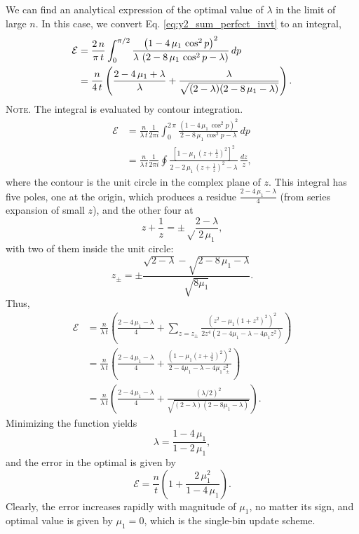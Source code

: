 \documentclass[reprint]{revtex4-1}
\newcommand{\note}[1]{{\color{DarkGreen}\footnotesize \textsc{Note.} #1}}
\begin{document}
We can find an analytical expression
of the optimal value of $\lambda$
in the limit of large $n$.
%
In this case,
we convert Eq.
\eqref{eq:y2_sum_perfect_invt}
to an integral,
$$
\begin{aligned}
\mathcal E
&=
\frac{2 \, n}{\pi \, t}
\int_0^{\pi/2}
\frac{ \left(1 - 4 \, \mu_1 \, \cos^2 p \right)^2 }
{ \lambda \, \left(2 - 8 \, \mu_1 \, \cos^2 p - \lambda \right) }
\, dp
\notag \\
&=
\frac{n}{4 \, t}
\left(
  \frac{2 - 4 \, \mu_1 + \lambda}{ \lambda }
  +
  \frac{ \lambda }
  { \sqrt{ (2 - \lambda) (2 - 8 \, \mu_1 - \lambda) } }
\right).
\end{aligned}
$$
\note{The integral is evaluated by contour integration.
$$
\begin{aligned}
\mathcal E
&=
\frac{n}{\lambda \, t}
\frac{1}{2 \pi i}
\int_0^{2 \, \pi}
\frac{ \left(1 - 4 \, \mu_1 \, \cos^2 p \right)^2 }
{ 2 - 8 \, \mu_1 \, \cos^2 p - \lambda }
\, dp
\\
&=
\frac{n}{\lambda \, t}
\frac{1}{2 \pi i}
\oint
\frac{ \left[1 - \mu_1 \, \left(z+\frac{1}{z}\right)^2 \right]^2 }
{ 2 - 2 \, \mu_1 \, \left(z + \frac{1}{z}\right)^2 - \lambda }
\, \frac{dz}{z},
\end{aligned}
$$
where the contour is the unit circle
in the complex plane of $z$.
%
This integral has five poles, one at the origin,
which produces a residue $\frac{2 - 4 \, \mu_1 - \lambda}{4}$
(from series expansion of small $z$),
and the other four at
$$
z + \frac{1}{z} = \pm\sqrt\frac{2-\lambda}{2 \, \mu_1},
$$
with two of them inside the unit circle:
$$
z_\pm = \pm \frac{\sqrt{2-\lambda} -\sqrt{2 - 8 \, \mu_1 - \lambda}}
{\sqrt{8 \mu_1}}.
$$
Thus,
$$
\begin{aligned}
  \mathcal E
&=
\frac{n}{\lambda \, t}
\left(
 \frac{2 - 4 \, \mu_1 - \lambda}{4}
 +
 \sum_{z = z_{\pm} }
 \frac{ \left(z^2 - \mu_1 (1 + z^2)^2 \right)^2 }
 { 2 z^4 (2 - 4 \mu_1 - \lambda - 4 \mu_1 z^2) }
\right)
\\
&=
\frac{n}{\lambda \, t}
\left(
  \frac{2 - 4 \, \mu_1 - \lambda}{4}
 +
 \frac{ \left(1 - \mu_1 \left(z + \frac{1}{z} \right)^2 \right)^2 }
 { 2 - 4 \mu_1 - \lambda - 4 \mu_1 z_{\pm}^2 }
\right)
\\
&=
\frac{n}{\lambda \, t}
\left(
  \frac{2 - 4 \, \mu_1 - \lambda}{4}
 +
 \frac{ (\lambda/2)^2 }
 { \sqrt{(2-\lambda) (2 - 8 \mu_1 -\lambda)} }
\right).
\end{aligned}
$$
}
%
Minimizing the function yields
%
\begin{equation}
\lambda = \frac{1 - 4 \, \mu_1} { 1 - 2 \, \mu_1 },
\label{eq:lambda_tridiag}
\end{equation}
%
and the error in the optimal is given by
%
\begin{equation}
\mathcal E
=
\frac{n}{t}
\left(
  1+ \frac{2 \, \mu_1^2}{1-4 \, \mu_1}
\right).
\label{eq:error_tridiag}
\end{equation}
%
Clearly, the error
increases rapidly with magnitude of $\mu_1$,
no matter its sign,
and optimal value is given by $\mu_1 = 0$,
which is the single-bin update scheme.
\end{document}
